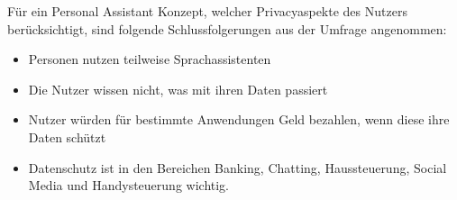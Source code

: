 Für ein Personal Assistant Konzept, welcher Privacyaspekte des Nutzers berücksichtigt, sind folgende Schlussfolgerungen aus der Umfrage angenommen:
\begin{itemize}	
	\item Personen nutzen teilweise Sprachassistenten
	\item Die Nutzer wissen nicht, was mit ihren Daten passiert
	\item Nutzer würden für bestimmte Anwendungen Geld bezahlen, wenn diese ihre Daten schützt
	\item Datenschutz ist in den Bereichen Banking, Chatting, Haussteuerung, Social Media und Handysteuerung wichtig.
\end{itemize}
